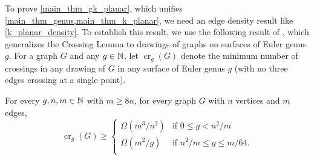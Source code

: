 \documentclass{patmorin}
\renewcommand{\ge}{\geqslant}
\renewcommand{\le}{\leqslant}
\DeclareMathOperator{\crr}{cr}
\begin{document}




%

To prove \cref{main_thm_gk_planar}, which unifies \cref{main_thm_genus,main_thm_k_planar}, we need an edge density result like \cref{k_planar_density}.   To establish this result, we use the following result of \citet{SSSV96}, which generalizes the Crossing Lemma to drawings of graphs on surfaces of Euler genus $g$.
For a graph $G$ and any $g\in\mathbb{N}$, let $\crr_g(G)$ denote the minimum number of crossings in any drawing of $G$ in any surface of Euler genus $g$ (with no three edges crossing at a single point).
\begin{lem}\label{shahroki}
  For every $g,n,m\in\mathbb{N}$ with $m\ge 8n$, for every graph $G$ with $n$ vertices and $m$ edges, 
  \[
      \crr_g(G) \ge 
      \begin{cases}
        \Omega(m^3/n^2) & \text{if $0 \le g< n^2/m$} \\
        \Omega(m^2/g) & \text{if $n^2/m \le g\le m/64$}. \\
      \end{cases}
  \]
\end{lem}
\end{document}
